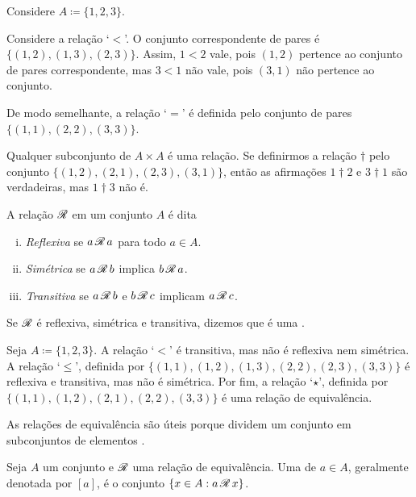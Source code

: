 \begin{example}
Considere $A \coloneqq \{ 1,2,3 \}$.

Considere a relação `$<$'. O conjunto correspondente de pares é
$\bigl\{ (1,2), (1,3), (2,3) \bigr\}$. Assim, $1 < 2$ vale, pois $(1,2)$
pertence ao conjunto de pares correspondente, mas $3 < 1$ não vale, pois
$(3,1)$ não pertence ao conjunto.

De modo semelhante, a relação `$=$' é definida pelo conjunto de pares
$\bigl\{ (1,1), (2,2), (3,3) \big\}$.

Qualquer subconjunto de $A \times A$ é uma relação. Se definirmos a relação
$\dagger$ pelo conjunto $\bigl\{ (1,2), (2,1), (2,3), (3,1) \bigr\}$, então
as afirmações $1 \dagger 2$ e $3 \dagger 1$ são verdadeiras, mas
$1 \dagger 3$ não é.
\end{example}

\begin{defn}
\pagebreak[2]
A relação
${\mathscr{R}}$ em um conjunto $A$ é dita
\begin{enumerate}[(i)]
\item
\emph{Reflexiva} se $a\, {\mathscr{R}} \, a$ para
todo $a \in A$.
\item
\emph{Simétrica} se $a\, {\mathscr{R}} \, b$ implica
$b \, {\mathscr{R}} \, a$.
\item
\emph{Transitiva} se $a\, {\mathscr{R}} \, b$ e
$b \, {\mathscr{R}} \, c$ implicam $a\, {\mathscr{R}} \, c$.
\end{enumerate}
Se ${\mathscr{R}}$ é reflexiva, simétrica e transitiva, dizemos que é uma
\emph{}.
\end{defn}

\begin{example}
Seja $A \coloneqq \{ 1,2,3 \}$.
A relação `$<$' é transitiva, mas não é reflexiva nem simétrica. A
relação `$\leq$', definida por
$\bigl\{ (1,1), (1,2), (1,3), (2,2), (2,3), (3,3) \bigr\}$
é reflexiva e transitiva, mas não é simétrica.
Por fim, a relação `$\star$', definida por
$\bigl\{ (1,1), (1,2), \allowbreak (2,1), \allowbreak (2,2), \allowbreak (3,3) \bigr\}$
é uma relação de equivalência.
\end{example}

As relações de equivalência são úteis porque dividem um conjunto em
subconjuntos de elementos .

\begin{defn}
Seja $A$ um conjunto e ${\mathscr{R}}$ uma relação de equivalência.
Uma \emph{} de $a \in A$, geralmente
denotada por $[a]$, é o conjunto
$\{ x \in A : a\, {\mathscr{R}} \, x \}$.
\end{defn}

